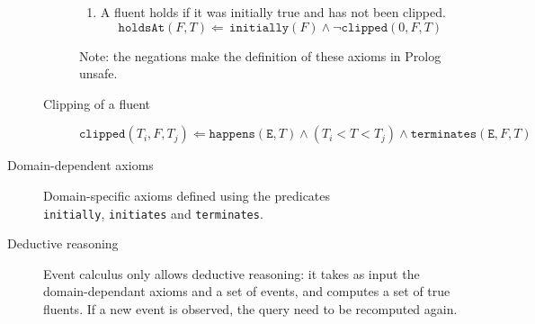 \begin{description}
\begin{description}
\begin{enumerate}
                    \item A fluent holds if it was initially true and has not been clipped.
                        \[ \texttt{holdsAt}(F, T) \Leftarrow\, \texttt{initially}(F) \land \lnot\texttt{clipped}(0, F, T) \]
                \end{enumerate}
                Note: the negations make the definition of these axioms in Prolog unsafe.
            
            \item[Clipping of a fluent]
                \[ \texttt{clipped}(T_i, F, T_j) \Leftarrow \texttt{happens}(\texttt{E}, T) \land (T_i < T < T_j) \land \texttt{terminates}(\texttt{E}, F, T) \]
        \end{description}

    \item[Domain-dependent axioms] 
        Domain-specific axioms defined using the predicates\\\texttt{initially}, \texttt{initiates} and \texttt{terminates}.
\end{description}

\begin{description}
    \item[Deductive reasoning] 
        Event calculus only allows deductive reasoning: 
        it takes as input the domain-dependant axioms and a set of events, and computes a set of true fluents.
        If a new event is observed, the query need to be recomputed again.
\end{description}


